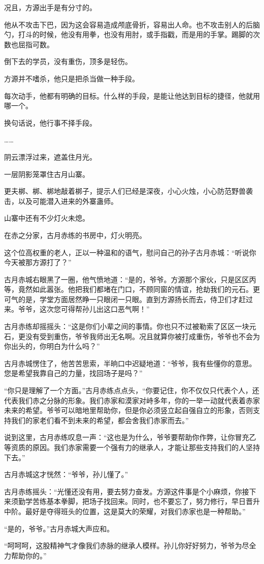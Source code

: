 \begin{this_body}
况且，方源出手是有分寸的。

他从不攻击下巴，因为这会容易造成颅底骨折，容易出人命。也不攻击别人的后脑勺，打斗的时候，他没有用拳，也没有用肘，或手指戳，而是用的手掌。踢脚的次数也屈指可数。

倒下去的学员，没有重伤，顶多是轻伤。

方源并不嗜杀，他只是把杀当做一种手段。

每次动手，他都有明确的目标。什么样的手段，是能让他达到目标的捷径，他就用哪一个。

换句话说，他行事不择手段。

……

阴云漂浮过来，遮盖住月光。

一层阴影笼罩住古月山寨。

更夫梆、梆、梆地敲着梆子，提示人们已经是深夜，小心火烛，小心防范野兽袭击，以及可能潜入进来的外寨蛊师。

山寨中还有不少灯火未熄。

在赤之分家，古月赤练的书房中，灯火明亮。

这个位高权重的老人，正以一种温和的语气，慰问自己的孙子古月赤城：“听说你今天被那方源打了？”

古月赤城右眼黑了一圈，他气愤地道：“是的，爷爷。方源那个家伙，只是区区丙等，竟然如此嚣张。他把我们都堵在门口，不顾同窗的情谊，抢劫我们的元石。更可气的是，学堂方面居然睁一只眼闭一只眼。直到方源扬长而去，侍卫们才赶过来。爷爷，这次您可得帮孙儿出这口恶气啊！”

古月赤练却摇摇头：“这是你们小辈之间的事情。你也只不过被勒索了区区一块元石，更没有受到重伤，爷爷我师出无名啊。况且就算你被打成重伤，爷爷也不会为你出头的，你明白为什么吗？”

古月赤城愣住了，他苦苦思索，半晌口中迟疑地道：“爷爷，我有些懂你的意思。您是希望我靠自己的力量，找回场子是吗？”

“你只是理解了一个方面。”古月赤练点点头，“你要记住，你不仅仅只代表个人，还代表我们赤之分脉的形象。我们赤家和漠家对峙多年，你的一举一动就代表着赤家未来的希望。爷爷可以暗地里帮助你，但是你必须竖立起自强自立的形象，否则支持我们的家老们看不到未来的希望，都会舍我们赤家而去。”

说到这里，古月赤练叹息一声：“这也是为什么，爷爷要帮助你作弊，让你冒充乙等资质的原因。我们赤家需要一个强有力的继承人，才能让那些支持我们的人坚持下去。”

古月赤城这才恍然：“爷爷，孙儿懂了。”

古月赤练摇头：“光懂还没有用，要去努力奋发。方源这件事是个小麻烦，你接下来须勤学苦练基本拳脚，把场子找回来。同时，也不要忘了，努力修行，早日晋升中阶。最好是夺得班头的位置，这是莫大的荣耀，对我们赤家也是一种帮助。”

“是的，爷爷。”古月赤城大声应和。

“呵呵呵，这股精神气才像我们赤脉的继承人模样。孙儿你好好努力，爷爷为尽全力帮助你的。”

\end{this_body}

